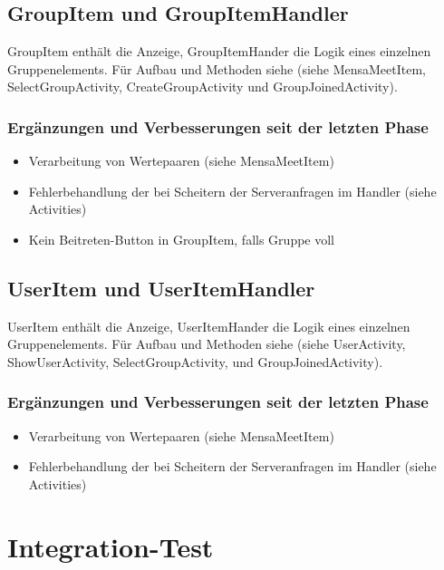 \documentclass[a4paper]{scrreprt}
\begin{document}
\subsection{GroupItem und GroupItemHandler}
GroupItem enthält die Anzeige, GroupItemHander die Logik eines einzelnen Gruppenelements. 
Für Aufbau und Methoden siehe (siehe MensaMeetItem, SelectGroupActivity, CreateGroupActivity und GroupJoinedActivity). 

\subsubsection{Ergänzungen und Verbesserungen seit der letzten Phase}
\begin{itemize}
\item Verarbeitung von Wertepaaren (siehe MensaMeetItem)
\item Fehlerbehandlung der bei Scheitern der Serveranfragen im Handler (siehe Activities)
\item Kein Beitreten-Button in GroupItem, falls Gruppe voll 

\end{itemize}

\subsection{UserItem und UserItemHandler}
UserItem enthält die Anzeige, UserItemHander die Logik eines einzelnen Gruppenelements. Für Aufbau und Methoden siehe (siehe UserActivity, ShowUserActivity, SelectGroupActivity,  und GroupJoinedActivity). 

\subsubsection{Ergänzungen und Verbesserungen seit der letzten Phase}
\begin{itemize}
\item Verarbeitung von Wertepaaren (siehe MensaMeetItem)
\item Fehlerbehandlung der bei Scheitern der Serveranfragen im Handler (siehe Activities)
\end{itemize}

\section{Integration-Test}
\end{document}

